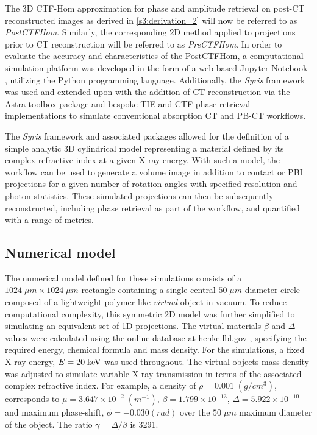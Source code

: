 \documentclass[twocolumn, switch]{article} %
\begin{document}
The 3D CTF-Hom approximation for phase and amplitude retrieval on post-CT reconstructed images as derived in \cref{s3:derivation_2} will now be referred to as \textit{PostCTFHom}. Similarly, the corresponding 2D method applied to projections prior to CT reconstruction will be referred to as \textit{PreCTFHom}.
In order to evaluate the accuracy and characteristics of the PostCTFHom, a computational simulation platform was developed in the form of a web-based Jupyter Notebook \cite{Kluyver2016JupyterWorkflows}, utilizing the Python \cite{VanRossum2009PythonManual} programming language. Additionally, the \textit{Syris} \cite{Farago2017Syris:Simulation} framework was used and extended upon with the addition of CT reconstruction via the Astra-toolbox \cite{vanAarle2016FastToolbox} package and bespoke TIE and CTF phase retrieval implementations to simulate conventional absorption CT and PB-CT workflows. 

The \textit{Syris} framework and associated packages allowed for the definition of a simple analytic 3D cylindrical model representing a material defined by its complex refractive index at a given X-ray energy. With such a model, the workflow can be used to generate a volume image in addition to contact or PBI projections for a given number of rotation angles with specified resolution and photon statistics. These simulated projections can then be subsequently reconstructed, including phase retrieval as part of the workflow, and quantified with a range of metrics. 

\subsection{Numerical model} \label{s3:single_cylider_numerical_model}

The numerical model defined for these simulations consists of a $1024\;\mu m \times 1024\;\mu m$ rectangle containing a single central $50\;\mu m$ diameter circle composed of a lightweight polymer like \textit{virtual} object in vacuum. To reduce computational complexity, this symmetric 2D model was further simplified to simulating an equivalent set of 1D projections. The virtual materials $\beta$ and $\Delta$ values were calculated using the online database at \href{https://henke.lbl.gov}{henke.lbl.gov} \cite{Henke1993X-Ray1-92}, specifying the required energy, chemical formula and mass density. For the simulations, a fixed X-ray energy, $E = 20\;{\rm{keV}}$ was used throughout. The virtual objects mass density was adjusted to simulate variable X-ray transmission in terms of the associated complex refractive index. For example, a density of $\rho=0.001\;\left(g/cm^3\right)$, corresponds to $\mu=3.647 \times {10^{-2}}\;\left(m ^{{-1}}\right)$, $\beta=1.799 \times {10^{-13}}$, $\Delta=5.922 \times {10^{-10}}$ and maximum phase-shift, $\phi=-0.030 \left(rad\right)$ over the $50\;\mu m$ maximum diameter of the object. The ratio $\gamma = \Delta / \beta$ is 3291.
\end{document}
